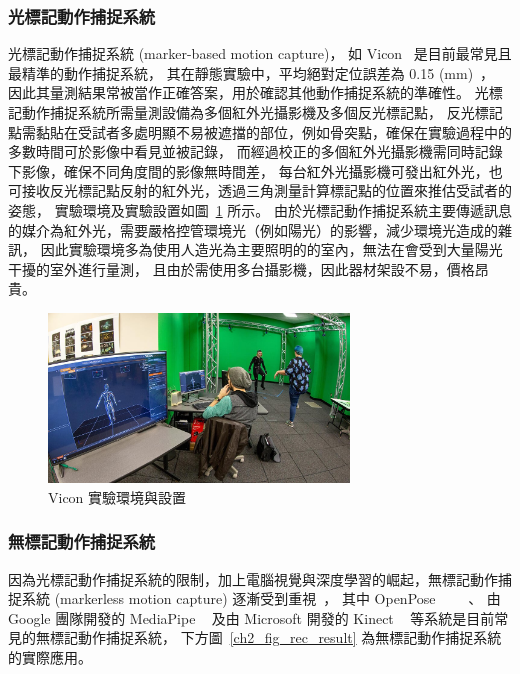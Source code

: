 \subsubsection{光標記動作捕捉系統}
光標記動作捕捉系統 (marker-based motion capture)，
如 Vicon ~\cite{vicon_web}是目前最常見且最精準的動作捕捉系統，
其在靜態實驗中，平均絕對定位誤差為 0.15 (mm)~\cite{merriaux2017study}，
因此其量測結果常被當作正確答案，用於確認其他動作捕捉系統的準確性。
光標記動作捕捉系統所需量測設備為多個紅外光攝影機及多個反光標記點，
反光標記點需黏貼在受試者多處明顯不易被遮擋的部位，例如骨突點，確保在實驗過程中的多數時間可於影像中看見並被記錄，
而經過校正的多個紅外光攝影機需同時記錄下影像，確保不同角度間的影像無時間差，
每台紅外光攝影機可發出紅外光，也可接收反光標記點反射的紅外光，透過三角測量計算標記點的位置來推估受試者的姿態，
實驗環境及實驗設置如圖~\ref{ch2_fig_OMC_Vicon} 所示。
由於光標記動作捕捉系統主要傳遞訊息的媒介為紅外光，需要嚴格控管環境光（例如陽光）的影響，減少環境光造成的雜訊，
因此實驗環境多為使用人造光為主要照明的的室內，無法在會受到大量陽光干擾的室外進行量測，
且由於需使用多台攝影機，因此器材架設不易，價格昂貴。

\begin{figure}[!ht]
    \centering
    \includegraphics[width=8cm]{figure/ch2_fig_OMC_Vicon.jpg}
     \caption[Vicon 實驗環境與設置~\cite{vicon_web}]{Vicon 實驗環境與設置~\cite{vicon_web}}
     \label{ch2_fig_OMC_Vicon}
\end{figure}

\subsubsection{無標記動作捕捉系統}
因為光標記動作捕捉系統的限制，加上電腦視覺與深度學習的崛起，無標記動作捕捉系統 (markerless motion capture) 逐漸受到重視~\cite{sarafianos20163d}，
其中 OpenPose ~\cite{8765346}~\cite{wei2016cpm}~\cite{simon2017hand}~\cite{cao2017realtime}、
由 Google 團隊開發的 MediaPipe ~\cite{mediapipe_web} 及由 Microsoft 開發的 Kinect ~\cite{zhang2012microsoft} 等系統是目前常見的無標記動作捕捉系統，
下方圖~\ref{ch2_fig_rec_result} 為無標記動作捕捉系統的實際應用。


